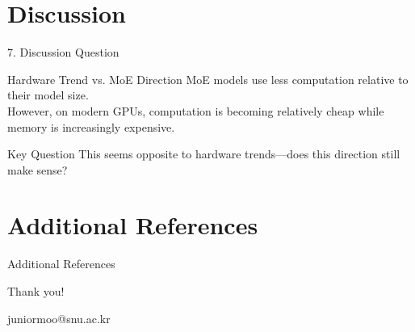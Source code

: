 \documentclass[11pt]{beamer}
\makeatletter
\newcommand{\email}{juniormoo@snu.ac.kr}
\makeatother
\begin{document}
\section{Discussion}
\begin{frame}{7. Discussion Question}
    \begin{block}{Hardware Trend vs. MoE Direction}
    MoE models use less computation relative to their model size. \\
    However, on modern GPUs, computation is becoming relatively cheap while memory is increasingly expensive.
    \end{block}
    
    \begin{alertblock}{Key Question}
    This seems opposite to hardware trends—does this direction still make sense?
    \end{alertblock}
    
\end{frame}

\section{Additional References}
\begin{frame}[allowframebreaks]{Additional References}
    
\end{frame}

\begin{frame}

\begin{center}
    Thank you!
    
    \email
\end{center}


\end{frame}
\end{document}
